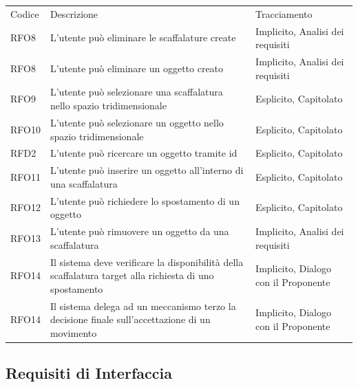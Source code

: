 \begin{table}[h]
\centering
{}
\begin{tabular}{ |>{\centering\arraybackslash}p{1cm}|>{\centering\arraybackslash}p{9cm}|>{\centering\arraybackslash}p{5cm}| }
\hline
\multicolumn{3}{|c|}{\Large Requisiti funzionali} \\
\hline
Codice & Descrizione & Tracciamento\\
\hline
RFO8 & L'utente può eliminare le scaffalature create & Implicito, Analisi dei requisiti\\
RFO8 & L'utente può eliminare un oggetto creato & Implicito, Analisi dei requisiti\\
RFO9 & L'utente può selezionare una scaffalatura nello spazio tridimensionale & Esplicito, Capitolato\\
RFO10 & L'utente può selezionare un oggetto nello spazio tridimensionale & Esplicito, Capitolato\\
RFD2 & L'utente può ricercare un oggetto tramite id & Esplicito, Capitolato\\
RFO11 & L'utente può inserire un oggetto all'interno di una scaffalatura& Esplicito, Capitolato\\
RFO12 & L'utente può richiedere lo spostamento di un oggetto & Esplicito, Capitolato\\
RFO13 & L'utente può rimuovere un oggetto da una scaffalatura & Implicito, Analisi dei requisiti\\
RFO14 & Il sistema deve verificare la disponibilità della scaffalatura target alla richiesta di uno spostamento & Implicito, Dialogo con il Proponente\\
RFO14 & Il sistema delega ad un meccanismo terzo la decisione finale sull'accettazione di un movimento & Implicito, Dialogo con il Proponente\\
\hline
\end{tabular}
\end{table}



\subsection{Requisiti di Interfaccia}

\setlength{\arrayrulewidth}{0.5mm}
\renewcommand{\arraystretch}{2.5}

